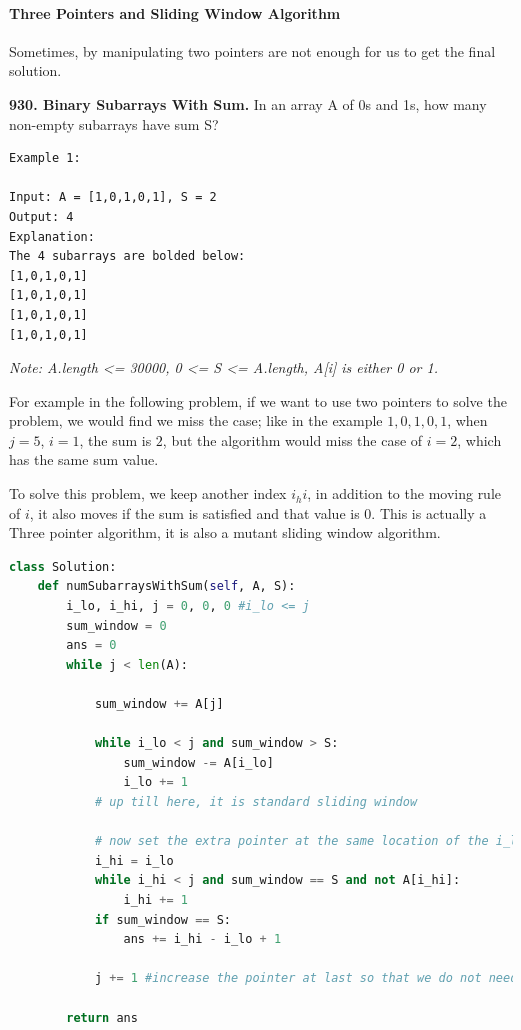 \documentclass[../searching.tex]{subfiles}
\begin{document}
\paragraph{Three Pointers and Sliding  Window Algorithm}
Sometimes, by manipulating two pointers are not enough for us to get the final solution. 
\begin{examples}
\item \textbf{930. Binary Subarrays With Sum.} In an array A of 0s and 1s, how many non-empty subarrays have sum S?
\begin{lstlisting}[numbers=none]
Example 1:

Input: A = [1,0,1,0,1], S = 2
Output: 4
Explanation: 
The 4 subarrays are bolded below:
[1,0,1,0,1]
[1,0,1,0,1]
[1,0,1,0,1]
[1,0,1,0,1]
\end{lstlisting}
\textit{Note: A.length <= 30000, 0 <= S <= A.length, A[i] is either 0 or 1.}

For example in the following problem, if we want to use two pointers to solve the problem, we would find we miss the case; like in the example $1, 0, 1, 0, 1$, when $j = 5$, $i = 1$, the sum is $2$, but the algorithm would miss the case of $i = 2$, which has the same sum value.
 
To solve this problem, we keep another index $i_hi$, in addition to the moving rule of $i$, it also moves if the sum is satisfied and that value is $0$. This is actually a Three pointer algorithm, it is also a mutant sliding window algorithm. 
\begin{lstlisting}[language=Python]
class Solution:
    def numSubarraysWithSum(self, A, S):
        i_lo, i_hi, j = 0, 0, 0 #i_lo <= j
        sum_window = 0
        ans = 0
        while j < len(A):

            sum_window += A[j]
                                     
            while i_lo < j and sum_window > S:
                sum_window -= A[i_lo]
                i_lo += 1
            # up till here, it is standard sliding window
            
            # now set the extra pointer at the same location of the i_lo
            i_hi = i_lo
            while i_hi < j and sum_window == S and not A[i_hi]:
                i_hi += 1
            if sum_window == S:
                ans += i_hi - i_lo + 1
                            
            j += 1 #increase the pointer at last so that we do not need to check if j<len again

        return ans
\end{lstlisting}
\end{examples}
\end{document}
